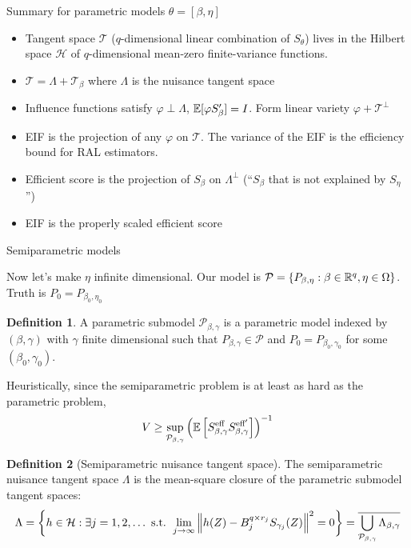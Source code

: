 \documentclass[10pt,aspectratio=169,handout]{beamer}
\theoremstyle{definition}
\newtheorem{defn}{Definition}
\begin{document}
\begin{frame}{Summary for parametric models}
$\theta = [\beta,\eta]$
  \begin{itemize}
    \item Tangent space $\mathcal T$ ($q$-dimensional linear combination of
    $S_\theta$) lives in the Hilbert space $\mathcal H$ of $q$-dimensional
    mean-zero
    finite-variance functions.
    \item $\mathcal T = \Lambda + \mathcal T_\beta$ where $\Lambda$ is the
    nuisance tangent space
    \item Influence functions satisfy $\varphi \perp \Lambda$, $\mathbb{E}
    [\varphi S_\beta'] = I$. Form linear variety $\varphi + \mathcal
    T^\perp$
    \item EIF is the projection of any $\varphi$ on $\mathcal T$. The
    variance of the EIF is the efficiency bound for RAL estimators.
    \item Efficient score is the projection of $S_\beta$ on $\Lambda^\perp$ (``$S_\beta$ that is not explained by $S_\eta$'')
    \item EIF is the properly scaled efficient score
  \end{itemize}
\end{frame}

\begin{frame}{Semiparametric models}
  \small

  Now let's make $\eta$ infinite dimensional. Our model is $\mathcal P = 
  \{P_{\beta,\eta} : \beta \in \mathbb{R}^q, \eta \in \Omega\}$. Truth is $P_0 =
  P_{\beta_0,\eta_0}$
  
  \begin{defn}
    A \alert{parametric submodel} $\mathcal P_{\beta,\gamma}$ is a
    parametric model indexed by $
    (\beta,\gamma)$ with $\gamma$ finite dimensional such that $P_
    {\beta,\gamma} \in \mathcal P$ and $P_0 = P_{\beta_0, \gamma_0}$ for
    some $(\beta_0, \gamma_0)$.
  \end{defn}
  
  Heuristically, since the semiparametric problem is at least as hard as
  the parametric problem, \[
  V \ge \sup_{\mathcal P_{\beta,\gamma}} \left({\mathbb{E}\left[{S_{\beta,\gamma}^
  {\text{eff}} S_{\beta,\gamma}^{\text{eff}'}}\right]}\right)^{-1}
  \]
  
  \begin{defn}[Semiparametric nuisance tangent space]
    The \alert{semiparametric nuisance tangent space} $\Lambda$ is the
    mean-square closure of the parametric submodel tangent spaces: \[
    \Lambda = \left\{{h \in \mathcal H : \exists j = 1,2,\ldots \text{ s.t. }
    \lim_{j\to\infty} \left\lVert h(Z) - B_j^{q\times r_j}S_{\gamma_j}(Z)\right\rVert^2 =
    0}\right\} = \overline{\bigcup_{\mathcal P_{\beta,\gamma}} \Lambda_
    {\beta,\gamma}}
    \]
  \end{defn}
\end{frame}
\end{document}
